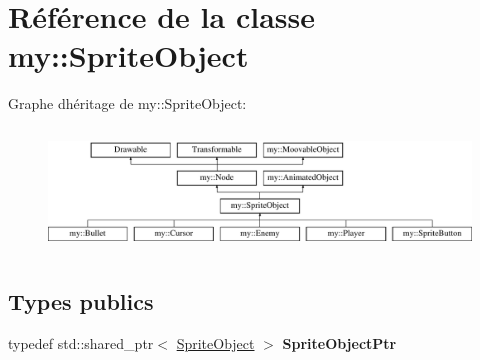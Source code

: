 \hypertarget{classmy_1_1SpriteObject}{}\section{Référence de la classe my\+:\+:Sprite\+Object}
\label{classmy_1_1SpriteObject}
Graphe d\textquotesingle{}héritage de my\+:\+:Sprite\+Object\+:\begin{figure}[H]
\begin{center}
\leavevmode
\includegraphics[height=3.318518cm]{classmy_1_1SpriteObject}
\end{center}
\end{figure}
\subsection*{Types publics}
\begin{DoxyCompactItemize}
\item 
\mbox{\label{classmy_1_1SpriteObject_a46560ae2f177e36d7025242b5cfd7401}} 
typedef std\+::shared\+\_\+ptr$<$ \hyperlink{classmy_1_1SpriteObject}{Sprite\+Object} $>$ {\bfseries Sprite\+Object\+Ptr}
\end{DoxyCompactItemize}
